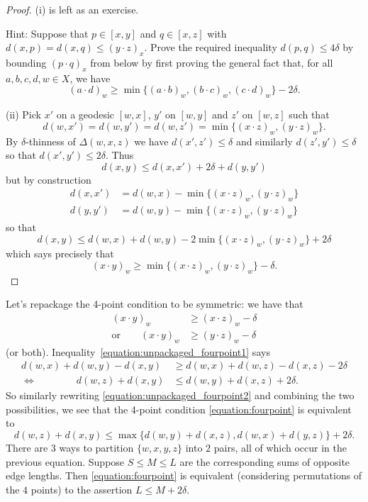 \begin{proof}
    (i) is left as an exercise.

    Hint: Suppose that $p \in [x, y]$ and $q \in [x, z]$ with $d(x, p) = d(x, q) \leq (y \cdot z)_x$.
    Prove the required inequality $d(p, q) \leq 4\delta$ by bounding $(p \cdot q)_x$ from below by first proving the general fact that, for all $a, b, c, d, w \in X$, we have \[
        (a \cdot d)_w \geq \min\{(a \cdot b)_w, (b \cdot c)_w, (c \cdot d)_w\} - 2\delta.
    \]

    (ii) Pick $x'$ on a geodesic $[w, x]$, $y'$ on $[w, y]$ and $z'$ on $[w, z]$ such that \[
        d(w, x') = d(w, y') = d(w, z') = \min\{ (x \cdot z)_w, (y \cdot z)_w \}.
    \]
    By $\delta$-thinness of $\Delta(w, x, z)$ we have $d(x', z') \leq \delta$ and similarly $d(z', y') \leq \delta$ so that $d(x', y') \leq 2\delta$.
    Thus \[
        d(x, y) \leq d(x, x') + 2\delta + d(y, y')
    \] but by construction
    \begin{align*}
        d(x, x') &= d(w, x) - \min\{ (x \cdot z)_w, (y \cdot z)_w \} \\
        d(y, y') &= d(w, y) - \min\{ (x \cdot z)_w, (y \cdot z)_w \}
    \end{align*}
    so that \[
        d(x, y) \leq d(w, x) + d(w, y) - 2\min\{ (x \cdot z)_w, (y \cdot z)_w \} + 2 \delta
    \] which says precisely that \[
        (x \cdot y)_w \geq \min\{ (x \cdot z)_w, (y \cdot z)_w \} - \delta.
    \]
\end{proof}

Let's repackage the 4-point condition to be symmetric: we have that
\begin{align}
    \label{equation:unpackaged_fourpoint1}
    (x \cdot y)_w
        &\geq (x \cdot z)_w - \delta \\
    \label{equation:unpackaged_fourpoint2}
    \text{or} \qquad (x \cdot y)_w
        &\geq (y \cdot z)_w - \delta
\end{align}
(or both).
Inequality~\eqref{equation:unpackaged_fourpoint1} says
\begin{align*}
    d(w, x) + d(w, y) - d(x, y)
        &\geq d(w, x) + d(w, z) - d(x, z) - 2\delta \\
    \Leftrightarrow \qquad \qquad d(w, z) + d(x, y)
        &\leq d(w, y) + d(x, z) + 2\delta.
\end{align*}
So similarly rewriting \eqref{equation:unpackaged_fourpoint2} and combining the two possibilities, we see that the 4-point condition \eqref{equation:fourpoint} is equivalent to \begin{equation}
    \label{equation:symmetric_fourpoint}
    d(w, z) + d(x, y) \leq \max \{ d(w, y) + d(x, z), d(w, x) + d(y, z) \} + 2\delta. \tag{$\diamond$}
\end{equation}
There are $3$ ways to partition $\{w, x, y, z\}$ into $2$ pairs, all of which occur in the previous equation.
Suppose $S \leq M \leq L$ are the corresponding sums of opposite edge lengths.
Then \eqref{equation:fourpoint} is equivalent (considering permutations of the $4$ points) to the assertion $L \leq M + 2\delta$.

